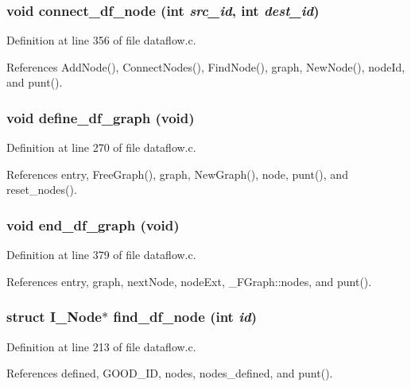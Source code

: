 \subsubsection{\setlength{\rightskip}{0pt plus 5cm}void connect\_\-df\_\-node (int {\em src\_\-id}, int {\em dest\_\-id})}\label{dataflow_8h_04c9b99c0375698dcfe160ee36ca146c}




Definition at line 356 of file dataflow.c.

References Add\-Node(), Connect\-Nodes(), Find\-Node(), graph, New\-Node(), node\-Id, and punt().
\subsubsection{\setlength{\rightskip}{0pt plus 5cm}void define\_\-df\_\-graph (void)}\label{dataflow_8h_18d17ac37de12e3bc188f054718aa646}




Definition at line 270 of file dataflow.c.

References entry, Free\-Graph(), graph, New\-Graph(), node, punt(), and reset\_\-nodes().
\subsubsection{\setlength{\rightskip}{0pt plus 5cm}void end\_\-df\_\-graph (void)}\label{dataflow_8h_bd53f0f6499bdd55bc4e4d8af145ccb5}




Definition at line 379 of file dataflow.c.

References entry, graph, next\-Node, node\-Ext, \_\-FGraph::nodes, and punt().
\subsubsection{\setlength{\rightskip}{0pt plus 5cm}struct \bf{I\_\-Node}$\ast$ find\_\-df\_\-node (int {\em id})}\label{dataflow_8h_831f2c23f46102a82ab271b75dcaf9bd}




Definition at line 213 of file dataflow.c.

References defined, GOOD\_\-ID, nodes, nodes\_\-defined, and punt().

